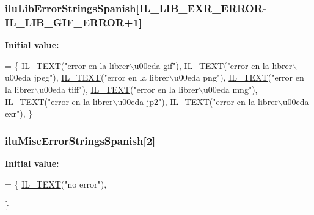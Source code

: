 \hypertarget{ilu__err-spanish_8h_afb021075feb8d1a6a5e78e94ad0ef802}{
\subsubsection[{ilu\-Lib\-Error\-Strings\-Spanish}]{ ilu\-Lib\-Error\-Strings\-Spanish\mbox{[}{\bf I\-L\-\_\-\-L\-I\-B\-\_\-\-E\-X\-R\-\_\-\-E\-R\-R\-O\-R}-\/{\bf I\-L\-\_\-\-L\-I\-B\-\_\-\-G\-I\-F\-\_\-\-E\-R\-R\-O\-R}+1\mbox{]}}}\label{ilu__err-spanish_8h_afb021075feb8d1a6a5e78e94ad0ef802}
{\bfseries Initial value\-:}
\begin{DoxyCode}
= \{
    \hyperlink{il_8h_a2907c2129d2ba2ebbae6aa6a69b7f685}{IL\_TEXT}(\textcolor{stringliteral}{"error en la librer\(\backslash\)u00eda gif"}),  
    \hyperlink{il_8h_a2907c2129d2ba2ebbae6aa6a69b7f685}{IL\_TEXT}(\textcolor{stringliteral}{"error en la librer\(\backslash\)u00eda jpeg"}),
    \hyperlink{il_8h_a2907c2129d2ba2ebbae6aa6a69b7f685}{IL\_TEXT}(\textcolor{stringliteral}{"error en la librer\(\backslash\)u00eda png"}),
    \hyperlink{il_8h_a2907c2129d2ba2ebbae6aa6a69b7f685}{IL\_TEXT}(\textcolor{stringliteral}{"error en la librer\(\backslash\)u00eda tiff"}),
    \hyperlink{il_8h_a2907c2129d2ba2ebbae6aa6a69b7f685}{IL\_TEXT}(\textcolor{stringliteral}{"error en la librer\(\backslash\)u00eda mng"}),
    \hyperlink{il_8h_a2907c2129d2ba2ebbae6aa6a69b7f685}{IL\_TEXT}(\textcolor{stringliteral}{"error en la librer\(\backslash\)u00eda jp2"}),
    \hyperlink{il_8h_a2907c2129d2ba2ebbae6aa6a69b7f685}{IL\_TEXT}(\textcolor{stringliteral}{"error en la librer\(\backslash\)u00eda exr"}),
\}
\end{DoxyCode}
\hypertarget{ilu__err-spanish_8h_af06b523dd6eab7d788cff420f7a8c4d0}{
\subsubsection[{ilu\-Misc\-Error\-Strings\-Spanish}]{ ilu\-Misc\-Error\-Strings\-Spanish\mbox{[}2\mbox{]}}}\label{ilu__err-spanish_8h_af06b523dd6eab7d788cff420f7a8c4d0}
{\bfseries Initial value\-:}
\begin{DoxyCode}
= \{
    \hyperlink{il_8h_a2907c2129d2ba2ebbae6aa6a69b7f685}{IL\_TEXT}(\textcolor{stringliteral}{"no error"}),

\}
\end{DoxyCode}
